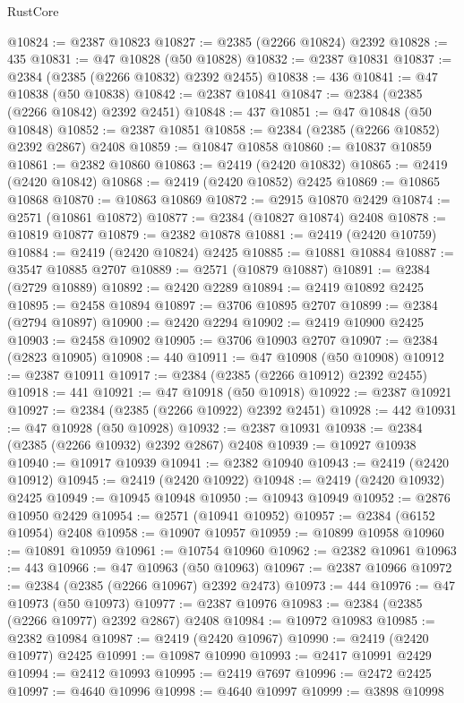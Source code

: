 \begin{lexlean}{RustCore}
\begin{coremodule}
@10824 := @2387 @10823
@10827 := @2385 (@2266 @10824) @2392
@10828 := 435
@10831 := @47 @10828 (@50 @10828)
@10832 := @2387 @10831
@10837 := @2384 (@2385 (@2266 @10832) @2392 @2455)
@10838 := 436
@10841 := @47 @10838 (@50 @10838)
@10842 := @2387 @10841
@10847 := @2384 (@2385 (@2266 @10842) @2392 @2451)
@10848 := 437
@10851 := @47 @10848 (@50 @10848)
@10852 := @2387 @10851
@10858 := @2384 (@2385 (@2266 @10852) @2392 @2867) @2408
@10859 := @10847 @10858
@10860 := @10837 @10859
@10861 := @2382 @10860
@10863 := @2419 (@2420 @10832)
@10865 := @2419 (@2420 @10842)
@10868 := @2419 (@2420 @10852) @2425
@10869 := @10865 @10868
@10870 := @10863 @10869
@10872 := @2915 @10870 @2429
@10874 := @2571 (@10861 @10872)
@10877 := @2384 (@10827 @10874) @2408
@10878 := @10819 @10877
@10879 := @2382 @10878
@10881 := @2419 (@2420 @10759)
@10884 := @2419 (@2420 @10824) @2425
@10885 := @10881 @10884
@10887 := @3547 @10885 @2707
@10889 := @2571 (@10879 @10887)
@10891 := @2384 (@2729 @10889)
@10892 := @2420 @2289
@10894 := @2419 @10892 @2425
@10895 := @2458 @10894
@10897 := @3706 @10895 @2707
@10899 := @2384 (@2794 @10897)
@10900 := @2420 @2294
@10902 := @2419 @10900 @2425
@10903 := @2458 @10902
@10905 := @3706 @10903 @2707
@10907 := @2384 (@2823 @10905)
@10908 := 440
@10911 := @47 @10908 (@50 @10908)
@10912 := @2387 @10911
@10917 := @2384 (@2385 (@2266 @10912) @2392 @2455)
@10918 := 441
@10921 := @47 @10918 (@50 @10918)
@10922 := @2387 @10921
@10927 := @2384 (@2385 (@2266 @10922) @2392 @2451)
@10928 := 442
@10931 := @47 @10928 (@50 @10928)
@10932 := @2387 @10931
@10938 := @2384 (@2385 (@2266 @10932) @2392 @2867) @2408
@10939 := @10927 @10938
@10940 := @10917 @10939
@10941 := @2382 @10940
@10943 := @2419 (@2420 @10912)
@10945 := @2419 (@2420 @10922)
@10948 := @2419 (@2420 @10932) @2425
@10949 := @10945 @10948
@10950 := @10943 @10949
@10952 := @2876 @10950 @2429
@10954 := @2571 (@10941 @10952)
@10957 := @2384 (@6152 @10954) @2408
@10958 := @10907 @10957
@10959 := @10899 @10958
@10960 := @10891 @10959
@10961 := @10754 @10960
@10962 := @2382 @10961
@10963 := 443
@10966 := @47 @10963 (@50 @10963)
@10967 := @2387 @10966
@10972 := @2384 (@2385 (@2266 @10967) @2392 @2473)
@10973 := 444
@10976 := @47 @10973 (@50 @10973)
@10977 := @2387 @10976
@10983 := @2384 (@2385 (@2266 @10977) @2392 @2867) @2408
@10984 := @10972 @10983
@10985 := @2382 @10984
@10987 := @2419 (@2420 @10967)
@10990 := @2419 (@2420 @10977) @2425
@10991 := @10987 @10990
@10993 := @2417 @10991 @2429
@10994 := @2412 @10993
@10995 := @2419 @7697
@10996 := @2472 @2425
@10997 := @4640 @10996
@10998 := @4640 @10997
@10999 := @3898 @10998

\end{coremodule}
\end{lexlean}
